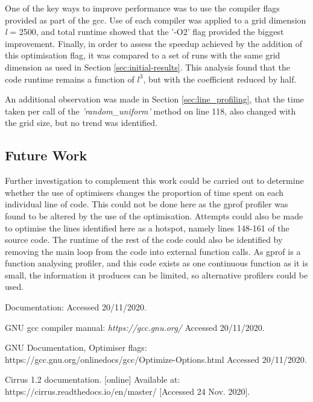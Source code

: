 \documentclass[12pt,a4paper]{article}
\begin{document}
One of the key ways to improve performance was to use the compiler flags provided as part of the gcc. Use of each compiler was applied to a grid dimension {\em l} = 2500, and total runtime showed that the '-O2' flag provided the biggest improvement.
Finally, in order to assess the speedup achieved by the addition of this optimisation flag, it was compared to a set of runs with the same grid dimension as used in Section \ref{sec:initial-results}. This analysis found that the code runtime remains a function of $l^3$, but with the coefficient reduced by half. 

An additional observation was made in Section \ref{sec:line_profiling}, that the time taken per call of the {\em'random\_uniform'} method on line 118, also changed with the grid size, but no trend was identified.

\subsection{Future Work}

Further investigation to complement this work could be carried out to determine whether the use of optimisers changes the proportion of time spent on each individual line of code.
This could not be done here as the gprof profiler was found to be altered by the use of the optimisation. 
Attempts could also be made to optimise the lines identified here as a hotspot, namely lines 148-161 of the source code. The runtime of the rest of the code could also be identified by removing the main loop from the code into external function calls. As gprof is a function analysing profiler, and this code exists as one continuous function as it is small, the information it produces can be limited, so alternative profilers could be used.


\begin{thebibliography}{100}

Documentation:{} Accessed 20/11/2020.

 GNU gcc compiler manual: {\em https://gcc.gnu.org/} Accessed 20/11/2020.

 GNU Documentation, Optimiser flags: { https://gcc.gnu.org/onlinedocs/gcc/Optimize-Options.html} Accessed 20/11/2020.

 Cirrus 1.2 documentation. [online] Available at: https://cirrus.readthedocs.io/en/master/ [Accessed 24 Nov. 2020].

\end{thebibliography}
\end{document}
